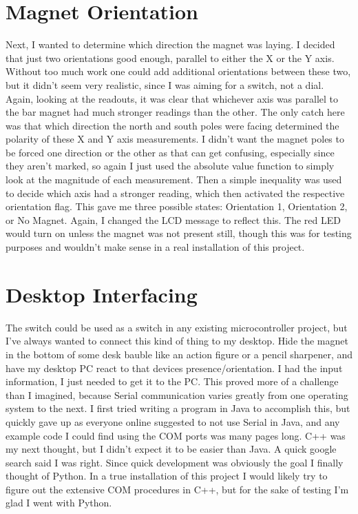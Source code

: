 \documentclass[prb,preprint]{revtex4-1}
\begin{document}
\section{Magnet Orientation}
Next, I wanted to determine which direction the magnet was laying. I decided that just two orientations good enough, parallel to either the X or the Y axis. Without too much work one could add additional orientations between these two, but it didn't seem very realistic, since I was aiming for a switch, not a dial. Again, looking at the readouts, it was clear that whichever axis was parallel to the bar magnet had much stronger readings than the other. The only catch here was that which direction the north and south poles were facing determined the polarity of these X and Y axis measurements. I didn't want the magnet poles to be forced one direction or the other as that can get confusing, especially since they aren't marked, so again I just used the absolute value function to simply look at the magnitude of each measurement. Then a simple inequality was used to decide which axis had a stronger reading, which then activated the respective orientation flag. This gave me three possible states: Orientation 1, Orientation 2, or No Magnet. Again, I changed the LCD message to reflect this. The red LED would turn on unless the magnet was not present still, though this was for testing purposes and wouldn't make sense in a real installation of this project. 

\section{Desktop Interfacing}
The switch could be used as a switch in any existing microcontroller project, but I've always wanted to connect this kind of thing to my desktop. Hide the magnet in the bottom of some desk bauble like an action figure or a pencil sharpener, and have my desktop PC react to that devices presence/orientation. I had the input information, I just needed to get it to the PC. This proved more of a challenge than I imagined, because Serial communication varies greatly from one operating system to the next. I first tried writing a program in Java to accomplish this, but quickly gave up as everyone online suggested to not use Serial in Java, and any example code I could find using the COM ports was many pages long. C++ was my next thought, but I didn't expect it to be easier than Java. A quick google search said I was right. Since quick development was obviously the goal I finally thought of Python. In a true installation of this project I would likely try to figure out the extensive COM procedures in C++, but for the sake of testing I'm glad I went with Python.
\end{document}
